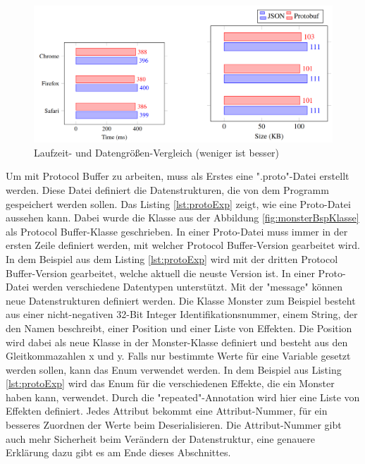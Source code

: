 \begin{figure}[htp]
    \centering
    \includegraphics[width=1\textwidth]{images/protobuf_browser.png}
    \caption{Laufzeit- und Datengrößen-Vergleich (weniger ist besser)\cite{currier2022protocol}}
    \label{fig:protobufBrowser}
\end{figure}

Um mit Protocol Buffer zu arbeiten, muss als Erstes eine ".proto"-Datei erstellt werden. Diese Datei definiert die Datenstrukturen, die von dem Programm gespeichert werden sollen. Das Listing \ref{lst:protoExp} zeigt, wie eine Proto-Datei aussehen kann. Dabei wurde die Klasse aus der Abbildung \ref{fig:monsterBspKlasse} als Protocol Buffer-Klasse geschrieben. In einer Proto-Datei muss immer in der ersten Zeile definiert werden, mit welcher Protocol Buffer-Version gearbeitet wird. In dem Beispiel aus dem Listing \ref{lst:protoExp} wird mit der dritten Protocol Buffer-Version gearbeitet, welche aktuell die neuste Version ist. In einer Proto-Datei werden verschiedene Datentypen unterstützt. Mit der "message" können neue Datenstrukturen definiert werden. Die Klasse Monster zum Beispiel besteht aus einer nicht-negativen 32-Bit Integer Identifikationsnummer, einem String, der den Namen beschreibt, einer Position und einer Liste von Effekten. Die Position wird dabei als neue Klasse in der Monster-Klasse definiert und besteht aus den Gleitkommazahlen x und y. Falls nur bestimmte Werte für eine Variable gesetzt werden sollen, kann das Enum verwendet werden. In dem Beispiel aus Listing \ref{lst:protoExp} wird das Enum für die verschiedenen Effekte, die ein Monster haben kann, verwendet. Durch die "repeated"-Annotation wird hier eine Liste von Effekten definiert. Jedes Attribut bekommt eine Attribut-Nummer, für ein besseres Zuordnen der Werte beim Deserialisieren.\cite{protobufLanguageGuide}\cite{protobufProtocolBufferJava} Die Attribut-Nummer gibt auch mehr Sicherheit beim Verändern der Datenstruktur, eine genauere Erklärung dazu gibt es am Ende dieses Abschnittes. 

